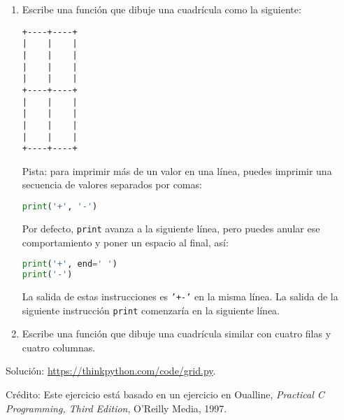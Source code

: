 \begin{enumerate}
\item Escribe una función que dibuje una cuadrícula como la siguiente:

\begin{lstlisting}
+----+----+
|    |    |
|    |    |
|    |    |
|    |    |
+----+----+
|    |    |
|    |    |
|    |    |
|    |    |
+----+----+
\end{lstlisting}

Pista: para imprimir más de un valor en una línea, puedes imprimir una secuencia de valores separados por comas:

\begin{lstlisting}[language=Python]
print('+', '-')
\end{lstlisting}

Por defecto, \texttt{print} avanza a la siguiente línea, pero puedes anular ese comportamiento y poner un espacio al final, así:

\begin{lstlisting}[language=Python]
print('+', end=' ')
print('-')
\end{lstlisting}

La salida de estas instrucciones es \texttt{'+-'} en la misma línea. La salida de la siguiente instrucción \texttt{print} comenzaría en la siguiente línea.

\item Escribe una función que dibuje una cuadrícula similar con cuatro filas y cuatro columnas.
\end{enumerate}

Solución: \href{https://thinkpython.com/code/grid.py}{https://thinkpython.com/code/grid.py}.

Crédito: Este ejercicio está basado en un ejercicio en Oualline, \textit{Practical C Programming, Third Edition}, O'Reilly Media, 1997.